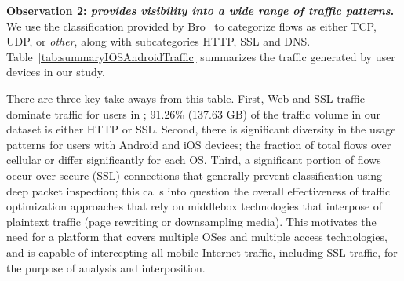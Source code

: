 \noindent\textbf{Observation 2: \emph{\meddle provides visibility into a wide range of traffic patterns}.} We use the classification 
provided by Bro~\cite{bro} to categorize flows as either TCP, UDP, or \emph{other}, along with subcategories HTTP, SSL and DNS.
Table~\ref{tab:summaryIOSAndroidTraffic} summarizes the traffic generated by user devices in our study. 

There are three key take-aways from this table. 
First, Web and SSL traffic dominate traffic for users in \mobWild; 91.26\% (137.63 GB) of the traffic volume in our \mobWild dataset is either HTTP or SSL.
Second, there is significant diversity in the usage patterns for users with Android and iOS devices; the fraction of total flows over cellular or \wifi differ significantly for each OS. 
Third, a significant portion of flows occur over secure (SSL) connections that generally prevent classification using deep packet inspection; this calls into question the overall effectiveness of traffic optimization approaches that rely on middlebox technologies that interpose of plaintext traffic (\eg page rewriting or downsampling media).
This motivates the need for a platform that covers multiple OSes and multiple access technologies, and is capable of intercepting all mobile Internet traffic, including SSL traffic, for the purpose of analysis and interposition. 

